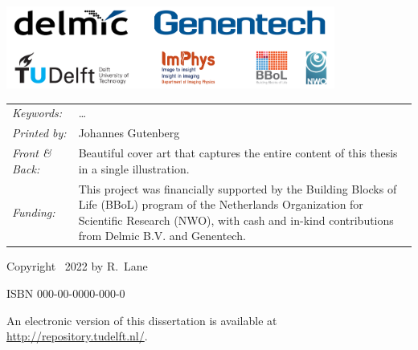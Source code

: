 \begin{titlepage}

\vfill
\begin{center}
    \includegraphics[height=2.7cm]{title/logos/logos_v1.pdf}
\end{center}
\vfill

\noindent
\begin{tabular}{@{}p{}@{}p{}}
    \textit{Keywords:} & \ldots \\[\medskipamount]
    \textit{Printed by:} & Johannes Gutenberg \\[\medskipamount]
    \textit{Front \& Back:} & Beautiful cover art that captures the entire content of this thesis in a single illustration. \\[\medskipamount]
    \textit{Funding:} & This project was financially supported by the Building Blocks of Life (BBoL) program of the Netherlands Organization for Scientific Research (NWO), with cash and in-kind contributions from Delmic B.V. and Genentech.
\end{tabular}

\vspace{4\bigskipamount}

\noindent Copyright \textcopyright\ 2022 by R.~Lane


\medskip
\noindent ISBN 000-00-0000-000-0

\medskip
\noindent An electronic version of this dissertation is available at \\
\url{http://repository.tudelft.nl/}.

\end{titlepage}
